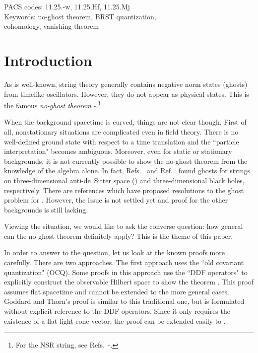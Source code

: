 \documentclass[a4paper,12pt]{article}
\begin{document}
\begin{flushright}
       PACS codes: 11.25.-w, 11.25.Hf, 11.25.Mj\\
       Keywords: no-ghost theorem, BRST quantization,\\
       cohomology, vanishing theorem\\
\end{flushright}

\vfill
\pagebreak

\pagestyle{plain}               %
\setcounter{page}{1}    %

\baselineskip=16pt

\section{Introduction}

As is well-known, string theory generally contains negative norm states
(ghosts) from timelike oscillators. However, they do not appear as physical
states. This is the famous {\it no-ghost theorem}
\cite{ocq1}-\cite{GM}.\footnote{For the NSR string, see
Refs.~\cite{nsr1}-\cite{FK}.}

When the background spacetime is curved, things are not clear though.
First of all, nonstationary situations are complicated even in field
theory. There is no well-defined ground state with respect to a time
translation and the ``particle interpretation" becomes ambiguous. Moreover,
even for static or stationary backgrounds, it is not currently possible to
show the no-ghost theorem from the knowledge of the algebra alone. In fact,
Refs.~\cite{sl2r} and Ref.~\cite{NS} found ghosts for strings on
three-dimensional anti-de~Sitter space (\coordHE{})
and three-dimensional black holes, 
respectively. There are references which have proposed resolutions to the
ghost problem  for \coordHE{} \cite{sl2r2,Evans:1998qu}.
However, the issue is not settled yet and proof for the other backgrounds is still lacking.

Viewing the situation, we would like to ask the converse question: how
general can the no-ghost theorem definitely apply? This is the theme of this
paper.

In order to answer to the question, let us look at the known proofs more
carefully. There are two approaches. The first approach uses the ``old
covariant quantization" (OCQ). Some proofs in this approach use the ``DDF
operators" to explicitly construct the observable Hilbert space to show the
theorem \cite{ocq1,nsr1}. This proof assumes flat spacetime and cannot be
extended to the more general cases. Goddard and Thorn's proof
\cite{ocq2,thorn3} is similar to this traditional one, but is formulated
without explicit reference to the DDF operators. Since it only requires the existence of a flat light-cone vector, the proof can be extended easily to \coordHE{}.
\end{document}
